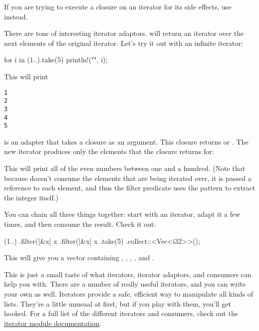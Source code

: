 If you are trying to execute a closure on an iterator for its side effects, use  instead.

\blank

There are tons of interesting iterator adaptors.  will return an iterator over the next  elements of the 
original iterator. Let's try it out with an infinite iterator:

\begin{rustc}
for i in (1..).take(5) {
    println!("{}", i);
}
\end{rustc}

This will print

\begin{verbatim}
1
2
3
4
5
\end{verbatim}

 is an adapter that takes a closure as an argument. This closure returns  or . The new iterator 
 produces only the elements that the closure returns  for:


This will print all of the even numbers between one and a hundred. (Note that because  doesn't consume the 
elements that are being iterated over, it is passed a reference to each element, and thus the filter predicate uses the 
 pattern to extract the integer itself.)

\blank

You can chain all three things together: start with an iterator, adapt it a few times, and then consume the result. Check it out:

\begin{rustc}
(1..)
    .filter(|&x| x %
    .filter(|&x| x %
    .take(5)
    .collect::<Vec<i32>>();
\end{rustc}

This will give you a vector containing , , , , and .

\blank

This is just a small taste of what iterators, iterator adaptors, and consumers can help you with. There are a number of really 
useful iterators, and you can write your own as well. Iterators provide a safe, efficient way to manipulate all kinds of lists. 
They're a little unusual at first, but if you play with them, you'll get hooked. For a full list of the different iterators and 
consumers, check out the \href{https://doc.rust-lang.org/std/iter/}{iterator module documentation}.
